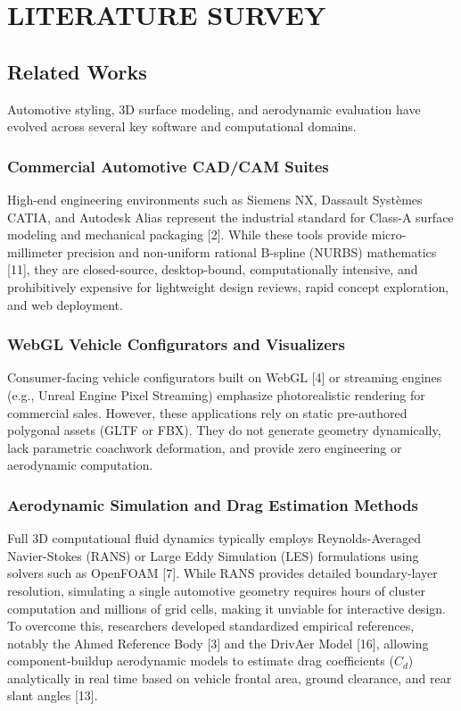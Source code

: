 \documentclass[12pt,a4paper]{report}
\begin{document}
\chapter{LITERATURE SURVEY}

\section{Related Works}
Automotive styling, 3D surface modeling, and aerodynamic evaluation have evolved across several key software and computational domains.

\subsection{Commercial Automotive CAD/CAM Suites}
High-end engineering environments such as Siemens NX, Dassault Systèmes CATIA, and Autodesk Alias represent the industrial standard for Class-A surface modeling and mechanical packaging [2]. While these tools provide micro-millimeter precision and non-uniform rational B-spline (NURBS) mathematics [11], they are closed-source, desktop-bound, computationally intensive, and prohibitively expensive for lightweight design reviews, rapid concept exploration, and web deployment.

\subsection{WebGL Vehicle Configurators and Visualizers}
Consumer-facing vehicle configurators built on WebGL [4] or streaming engines (e.g., Unreal Engine Pixel Streaming) emphasize photorealistic rendering for commercial sales. However, these applications rely on static pre-authored polygonal assets (GLTF or FBX). They do not generate geometry dynamically, lack parametric coachwork deformation, and provide zero engineering or aerodynamic computation.

\subsection{Aerodynamic Simulation and Drag Estimation Methods}
Full 3D computational fluid dynamics typically employs Reynolds-Averaged Navier-Stokes (RANS) or Large Eddy Simulation (LES) formulations using solvers such as OpenFOAM [7]. While RANS provides detailed boundary-layer resolution, simulating a single automotive geometry requires hours of cluster computation and millions of grid cells, making it unviable for interactive design. To overcome this, researchers developed standardized empirical references, notably the Ahmed Reference Body [3] and the DrivAer Model [16], allowing component-buildup aerodynamic models to estimate drag coefficients ($C_d$) analytically in real time based on vehicle frontal area, ground clearance, and rear slant angles [13].
\end{document}
